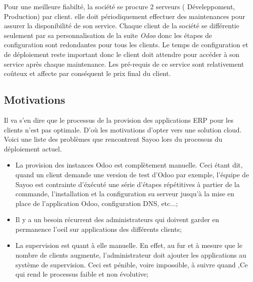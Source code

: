 \begin{onehalfspace}
Pour une meilleure fiabilté, la société se procure 2 serveurs ( Déveleppoment, Production) par client. elle doit périodiquement effectuer des maintenances pour assurer la disponibilité de son service. Chaque client de la société se différentie seulement par sa personnalisation de la suite \emph{Odoo} donc les étapes de configuration sont redondantes pour tous les clients. Le temps de configuration et de déploiement reste important donc le client doit attendre pour accéder à son service après chaque maintenance. Les pré-requis de ce service sont relativement coûteux et affecte par conséquent le prix final du client.
  
















\subsection{Motivations}

Il va s'en dire que le processus de la provision des applications ERP pour les clients n'est pas optimale. D'où les motivations d'opter vers une solution cloud. Voici une liste des problèmes que rencontrent Sayoo lors du processus du déploiement actuel.

\begin{itemize}

\item La provision des instances Odoo est complètement manuelle. Ceci étant dit, quand un client demande une version de test d'Odoo par exemple, l'équipe de Sayoo est contrainte d'éxécuté une série d'étapes répétitives à partier de la commande, l'installation et la configuration su serveur jusqu'à la mise en place de l'application Odoo, configuration DNS, etc...;

\item Il y a un besoin récurrent des administrateurs qui doivent garder en permanence l'oeil sur applications des différents clients;

\item La supervision est quant à elle manuelle. En effet, au fur et à mesure que le nombre de clients augmente, l'administrateur doit ajouter les applications au système de supervision. Ceci est pénible, voire impossible, à suivre quand ,Ce qui rend le processus faible et non évolutive;


\end{itemize}
\end{onehalfspace}
